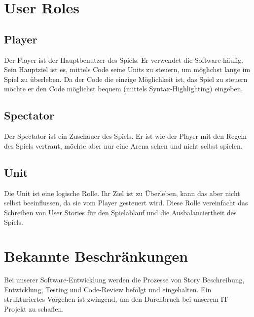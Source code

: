 \documentclass[a4paper, 11pt]{scrartcl}
\let\oldsection\section
\renewcommand\section{\clearpage\oldsection}
\begin{document}
\section{User Roles}
\subsection{Player}
Der Player ist der Hauptbenutzer des Spiels. Er verwendet die Software häufig. Sein Hauptziel ist es, mittels Code seine Units zu steuern, um möglichst lange im Spiel zu überleben. Da der Code die einzige Möglichkeit ist, das Spiel zu steuern möchte er den Code möglichst bequem (mittels Syntax-Highlighting) eingeben.
\subsection{Spectator}
Der Spectator ist ein Zuschauer des Spiels. Er ist wie der Player mit den Regeln des Spiels vertraut, möchte aber nur eine Arena sehen und nicht selbst spielen. 
\subsection{Unit}
Die Unit ist eine logische Rolle. Ihr Ziel ist zu Überleben, kann das aber nicht selbst beeinflussen, da sie vom Player gesteuert wird. Diese Rolle vereinfacht das Schreiben von User Stories für den Spielablauf und die Ausbalanciertheit des Spiels. 

\section{Bekannte Beschränkungen}

Bei unserer Software-Entwicklung werden die Prozesse von Story Beschreibung, Entwicklung, Testing und Code-Review befolgt und eingehalten.
Ein strukturiertes Vorgehen ist zwingend, um den Durchbruch bei unserem IT-Projekt zu schaffen.
\end{document}
